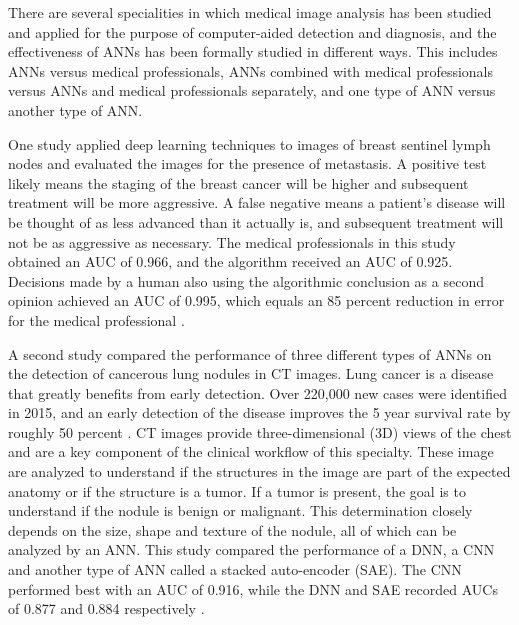 \documentclass[sigconf]{acmart}
\begin{document}
There are several specialities in which medical image analysis has been studied and applied for the purpose of computer-aided detection and diagnosis, and the effectiveness of ANNs has been formally studied in different ways. This includes ANNs versus medical professionals, ANNs combined with medical professionals versus ANNs and medical professionals separately, and one type of ANN versus another type of ANN.

One study applied deep learning techniques to images of breast sentinel lymph nodes and evaluated the images for the presence of metastasis. A positive test likely means the staging of the breast cancer will be higher and subsequent treatment will be more aggressive. A false negative means a patient's disease will be thought of as less advanced than it actually is, and subsequent treatment will not be as aggressive as necessary. The medical professionals in this study obtained an AUC of 0.966, and the algorithm received an AUC of 0.925. Decisions made by a human also using the algorithmic conclusion as a second opinion achieved an AUC of 0.995, which equals an 85 percent reduction in error for the medical professional \cite{cite09}.

A second study compared the performance of three different types of ANNs on the detection of cancerous lung nodules in CT images. Lung cancer is a disease that greatly benefits from early detection. Over 220,000 new cases were identified in 2015, and an early detection of the disease improves the 5 year survival rate by roughly 50 percent \cite{cite10}. CT images provide three-dimensional (3D) views of the chest and are a key component of the clinical workflow of this specialty. These image are analyzed to understand if the structures in the image are part of the expected anatomy or if the structure is a tumor. If a tumor is present, the goal is to understand if the nodule is benign or malignant. This determination closely depends on the size, shape and texture of the nodule, all of which can be analyzed by an ANN. This study compared the performance of a DNN, a CNN and another type of ANN called a stacked auto-encoder (SAE). The CNN performed best with an AUC of 0.916, while the DNN and SAE recorded AUCs of 0.877 and 0.884 respectively \cite{cite10}.
\end{document}
